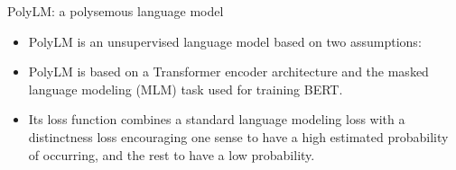 \documentclass[handout]{beamer}
\begin{document}
\begin{frame}{PolyLM: a polysemous language model}
\begin{scriptsize}
\begin{itemize}
 \item PolyLM is an unsupervised language model based on two assumptions:


\item PolyLM is based on a Transformer encoder architecture and the masked language modeling (MLM) task used for training BERT.

\item Its loss function  combines a standard  language modeling loss with a distinctness loss  encouraging one sense to have a high estimated probability of occurring, and the rest to have a low probability.





 \end{itemize}
\end{scriptsize}
\end{frame}
\end{document}
